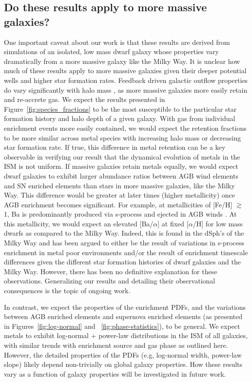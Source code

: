 \documentclass[twocolumn]{aastex61}
\begin{document}
\subsection{Do these results apply to more massive galaxies?}
\label{sec:massive galaxies}
One important caveat about our work is that these results are derived from simulations of an isolated, low mass dwarf galaxy whose properties vary dramatically from a more massive galaxy like the Milky Way. It is unclear how much of these results apply to more massive galaxies given their deeper potential wells and higher star formation rates. Feedback driven galactic outflow properties do vary significantly with halo mass \citep[e.g.][]{MacLowFerrara1999,Muratov2017}, as more massive galaxies more easily retain and re-accrete gas. We expect the results presented in Figure~\ref{fig:species_fractions} to be the most susceptible to the particular star formation history and halo depth of a given galaxy. With gas from individual enrichment events more easily contained, we would expect the retention fractions to be more similar across metal species with increasing halo mass or decreasing star formation rate. If true, this difference in metal retention can be a key observable in verifying our result that the dynamical evolution of metals in the ISM is not uniform. If massive galaxies retain metals equally, we would expect dwarf galaxies to exhibit larger abundance ratios between AGB wind elements and SN enriched elements than stars in more massive galaxies, like the Milky Way. This difference would be greater at later times (higher metallicity) once AGB enrichment becomes significant. For example, at metallicities of [Fe/H] $\gtrsim$ 1, Ba is predominantly produced via s-process and ejected in AGB winds \citep{Travaglio1999,Travaglio2004}. At this metallicity, we would expect an elevated [Ba/$\alpha$] at fixed [$\alpha$/H] for low mass dwarfs as compared to the Milky Way. Indeed, this is found in the dSph's of the Milky Way \citep[see ][]{Tolstoy2009} and has been argued to either be the result of variations in s-process enrichment in metal poor environments and/or the result of enrichment timescale differences given the different star formation histories of dwarf galaxies and the Milky Way. However, there has been no definitive explanation for these observations. Generalizing our results and detailing their observational consequences is the topic of ongoing work.

In contrast, we expect the properties of the enrichment PDFs, and the variations between AGB enriched elements and supernova enriched elements (as presented in Figures~\ref{fig:log-normal} and ~\ref{fig:phase-statistics}), to be general. We expect metals to exhibit log-normal + power-law distributions in the ISM of all galaxies, with similar trends with enrichment source and gas phase as outlined here. However, the detailed properties of the PDFs (e.g, log-normal width, power-law slope) likely depend non-trivially on global galaxy properties. How these results vary as a function of galaxy properties will be investigated in future work.
\end{document}
